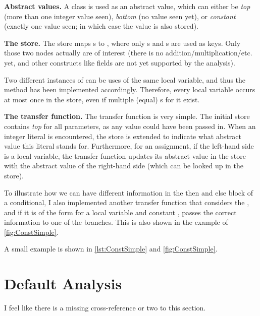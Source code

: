 \textbf{Abstract values.} A class  is used as an
abstract value, which can either be \emph{top} (more than one integer
value seen), \emph{bottom} (no value seen yet), or \emph{constant}
(exactly one value seen; in which case the value is also stored).

\textbf{The store.} The store maps s to ,
where only s and s
are used as keys.  Only those two nodes actually are of interest
(there is no addition/multiplication/etc. yet, and other constructs
like fields are not yet supported by the analysis).

Two different instances of  can be uses of the
same local variable, and thus the  method has been
implemented accordingly. Therefore, every local variable occurs at
most once in the store, even if multiple (equal)
s for it exist.

\textbf{The transfer function.} The transfer function is very
simple. The initial store contains \emph{top} for all parameters, as
any value could have been passed in.  When an integer literal is
encountered, the store is extended to indicate what abstract value
this literal stands for. Furthermore, for an assignment, if the
left-hand side is a local variable, the transfer function updates its
abstract value in the store with the abstract value of the right-hand
side (which can be looked up in the store).

To illustrate how we can have different information in the then and
else block of a conditional, I also implemented another transfer
function that considers the , and if it is of the
form  for a local variable  and constant
, passes the correct information to one of the branches. This
is also shown in the example of \autoref{fig:ConstSimple}.

 A small example is shown in \autoref{lst:ConstSimple}
and \autoref{fig:ConstSimple}.




\section{Default Analysis}

\begin{workinprogress}
I feel like there is a missing cross-reference or two to this section.
\end{workinprogress}

